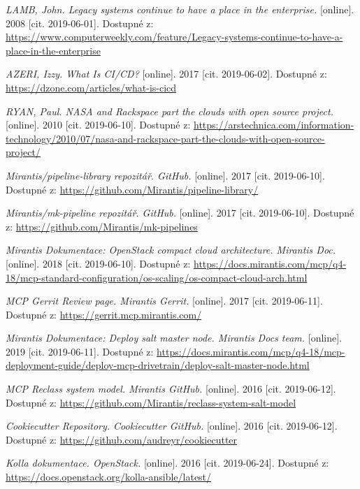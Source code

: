 \begin{thebibliography}{10}
    \emph{LAMB, John. Legacy systems continue to have a place in the enterprise.} [online]. 2008 [cit. 2019-06-01]. Dostupné z: \url{https://www.computerweekly.com/feature/Legacy-systems-continue-to-have-a-place-in-the-enterprise} 
    
    \emph{AZERI, Izzy. What Is CI/CD?} [online]. 2017 [cit. 2019-06-02]. Dostupné z: \url{https://dzone.com/articles/what-is-cicd} 

    \emph{RYAN, Paul. NASA and Rackspace part the clouds with open source project.} [online]. 2010 [cit. 2019-06-10]. Dostupné z: \url{https://arstechnica.com/information-technology/2010/07/nasa-and-rackspace-part-the-clouds-with-open-source-project/} 

    \emph{Mirantis/pipeline-library repozitář. GitHub.} [online]. 2017 [cit. 2019-06-10]. Dostupné z: \url{https://github.com/Mirantis/pipeline-library/} 

    \emph{Mirantis/mk-pipeline repozitář. GitHub.} [online]. 2017 [cit. 2019-06-10]. Dostupné z: \url{https://github.com/Mirantis/mk-pipelines} 
    
    \emph{Mirantis Dokumentace: OpenStack compact cloud architecture. Mirantis Doc.} [online]. 2018 [cit. 2019-06-10]. Dostupné z: \url{https://docs.mirantis.com/mcp/q4-18/mcp-standard-configuration/os-scaling/os-compact-cloud-arch.html}  

    \emph{MCP Gerrit Review page. Mirantis Gerrit.} [online]. 2017 [cit. 2019-06-11]. Dostupné z: \url{https://gerrit.mcp.mirantis.com/}

    \emph{Mirantis Dokumentace: Deploy salt master node. Mirantis Docs team.} [online]. 2019 [cit. 2019-06-11]. Dostupné z: \url{https://docs.mirantis.com/mcp/q4-18/mcp-deployment-guide/deploy-mcp-drivetrain/deploy-salt-master-node.html} 

    \emph{MCP Reclass system model. Mirantis GitHub.} [online]. 2016 [cit. 2019-06-12]. Dostupné z: \url{https://github.com/Mirantis/reclass-system-salt-model}

    \emph{Cookiecutter Repository. Cookiecutter GitHub.} [online]. 2016 [cit. 2019-06-12]. Dostupné z: \url{https://github.com/audreyr/cookiecutter}


    \emph{Kolla dokumentace. OpenStack.} [online]. 2016 [cit. 2019-06-24]. Dostupné z: \url{https://docs.openstack.org/kolla-ansible/latest/}
    

\end{thebibliography}
